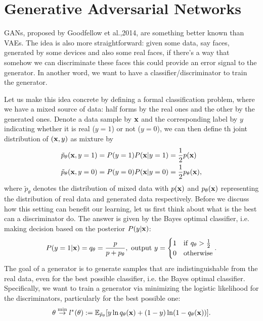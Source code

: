 \documentclass[../main.tex]{subfiles}
\begin{document}
\section{Generative Adversarial Networks}
GANs, proposed by Goodfellow et al.,2014, are something better known than VAEs. The idea is also more straightforward: given some data, say faces, generated by some devices and also some real faces, if there's a way that somehow we can discriminate these faces this could provide an error signal to the generator. In another word, we want to have a classifier/discriminator to train the generator.
\par Let us make this idea concrete by defining a formal classification problem, where we have a mixed source of data: half forms by the real ones and the other by the generated ones. Denote a data sample by ${\bf x}$ and the corresponding label by ${y}$ indicating whether it is real ($y=1$) or not ($y=0$), we can then define th joint distribution of $({\bf x},y)$ as mixture by
\begin{align*}
&\tilde{p}_\theta({\bf x},y=1)=P(y=1)P({\bf x}|y=1)=\frac{1}{2}p({\bf x})\\
&\tilde{p}_\theta({\bf x},y=0)=P(y=0)P({\bf x}|y=0)=\frac{1}{2}p_\theta({\bf x}),
\end{align*}
where $\tilde{p}_\theta$ denotes the distribution of mixed data with $p({\bf x})$ and $p_\theta({\bf x})$ representing the distribution of real data and generated data respectively. Before we discuss how this setting can benefit our learning, let us first think about what is the best can a discriminator do. The answer is given by the Bayes optimal classifier, i.e. making decision based on the posterior $P(y|{\bf x})$:
\begin{equation*}
P(y=1|{\bf x}) = q_\theta=\frac{p}{p+p_\theta},\ {\rm output}\ y=\begin{cases}
1 & {\rm if}\ q_\theta>\frac{1}{2}\\
0 & {\rm otherwise}
\end{cases}.
\end{equation*}
The goal of a generator is to generate samples that are indistinguishable from the real data, even for the best possible classifier, i.e. the Bayes optimal classifier. Specifically, we want to train a generator via minimizing the logistic likelihood for the discriminators, particularly for the best possible one:
\begin{equation*}
\theta\overset{\min}{\rightarrow}l^*(\theta):=\mathbb{E}_{\tilde{p}_\theta}[y\ln q_\theta({\bf x})+(1-y)\ln(1-q_\theta({\bf x}))].
\end{equation*}
\end{document}
